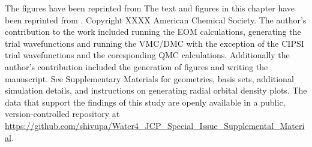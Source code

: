The figures have been reprinted from \cite{Upadhyay2020}
The text and figures in this chapter have been reprinted from \cite{Upadhyay2020}.
Copyright XXXX American Chemical Society. %
The author's contribution to the work included running the EOM calculations, generating the trial wavefunctions and running the VMC/DMC with the exception of the CIPSI trial wavefunctions and the coresponding QMC calculations. Additionally the author's contribution included the generation of figures and writing the manuscript.
See Supplementary Materials for geometries, basis sets, additional simulation details, and instructions on generating radial orbital density plots.
The data that support the findings of this study are openly available in a public, version-controlled repository at \url{https://github.com/shivupa/Water4_JCP_Special_Issue_Supplemental_Material}.
